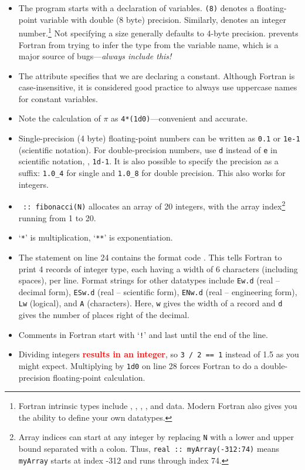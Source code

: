 \begin{itemize}
  \item The program starts with a declaration of variables.
    \texttt{(8)} denotes a floating-point variable with double (8 byte) precision.
    Similarly,  denotes an integer number.\footnote{Fortran intrinsic types include , , , , and  data. Modern Fortran also gives you the ability to define your own datatypes.}
    Not specifying a size generally defaults to 4-byte precision.
     prevents Fortran from trying to infer the type from the variable name, which is a major source of bugs---\emph{always include this!}
  \item The attribute  specifies that we are declaring a constant.
    Although Fortran is case-insensitive, it is considered good practice to always use uppercase names for constant variables.
  \item Note the calculation of $\pi$ as \texttt{4*(1d0)}---convenient and accurate.
  \item Single-precision (4 byte) floating-point numbers can be written as \texttt{0.1} or \texttt{1e-1} (scientific notation).
    For double-precision numbers, use \texttt{d} instead of \texttt{e} in scientific notation, \eg, \texttt{1d-1}.
    It is also possible to specify the precision as a suffix: \texttt{1.0\_4} for single and \texttt{1.0\_8} for double precision.
    This also works for integers.
  \item \texttt{ :: fibonacci(N)} allocates an array of 20
    integers, with the array index\footnote{Array indices can start at any integer by replacing \texttt{N} with a lower and upper bound separated with a colon. Thus, \lstinline$real :: myArray(-312:74)$ means \texttt{myArray} starts at index -312 and runs through index 74.} running from 1 to 20.
  \item `\texttt{*}' is multiplication, `\texttt{**}' is exponentiation.
  \item The  statement on line 24 contains the format code .
    This tells Fortran to print 4 records of integer type, each having a width of 6 characters (including spaces), per line. 
    Format strings for other datatypes include \texttt{Ew.d} (real -- decimal form), \texttt{ESw.d} (real -- scientific form), \texttt{ENw.d} (real -- engineering form), \texttt{Lw} (logical), and \texttt{A} (characters). Here, \texttt{w} gives the width of a record and \texttt{d} gives the number of places right of the decimal.
  \item Comments in Fortran start with `\texttt{!}' and last until the end of the line.
  \item Dividing integers \textcolor{red}{\textbf{results in an integer}}, so \texttt{3 / 2 == 1} instead of 1.5 as you might expect.
    Multiplying by \texttt{1d0} on line 28 forces Fortran to do a double-precision floating-point calculation.
\end{itemize}
